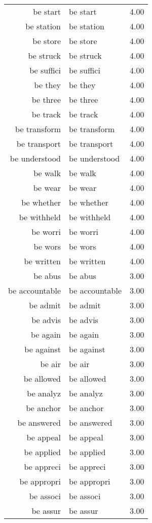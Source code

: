 \begin{table}[ht]
\begin{tabular}{rlr}
  be start & be start & 4.00 \\ 
  be station & be station & 4.00 \\ 
  be store & be store & 4.00 \\ 
  be struck & be struck & 4.00 \\ 
  be suffici & be suffici & 4.00 \\ 
  be they & be they & 4.00 \\ 
  be three & be three & 4.00 \\ 
  be track & be track & 4.00 \\ 
  be transform & be transform & 4.00 \\ 
  be transport & be transport & 4.00 \\ 
  be understood & be understood & 4.00 \\ 
  be walk & be walk & 4.00 \\ 
  be wear & be wear & 4.00 \\ 
  be whether & be whether & 4.00 \\ 
  be withheld & be withheld & 4.00 \\ 
  be worri & be worri & 4.00 \\ 
  be wors & be wors & 4.00 \\ 
  be written & be written & 4.00 \\ 
  be abus & be abus & 3.00 \\ 
  be accountable & be accountable & 3.00 \\ 
  be admit & be admit & 3.00 \\ 
  be advis & be advis & 3.00 \\ 
  be again & be again & 3.00 \\ 
  be against & be against & 3.00 \\ 
  be air & be air & 3.00 \\ 
  be allowed & be allowed & 3.00 \\ 
  be analyz & be analyz & 3.00 \\ 
  be anchor & be anchor & 3.00 \\ 
  be answered & be answered & 3.00 \\ 
  be appeal & be appeal & 3.00 \\ 
  be applied & be applied & 3.00 \\ 
  be appreci & be appreci & 3.00 \\ 
  be appropri & be appropri & 3.00 \\ 
  be associ & be associ & 3.00 \\ 
  be assur & be assur & 3.00 \\ 

\end{tabular}
\end{table}
